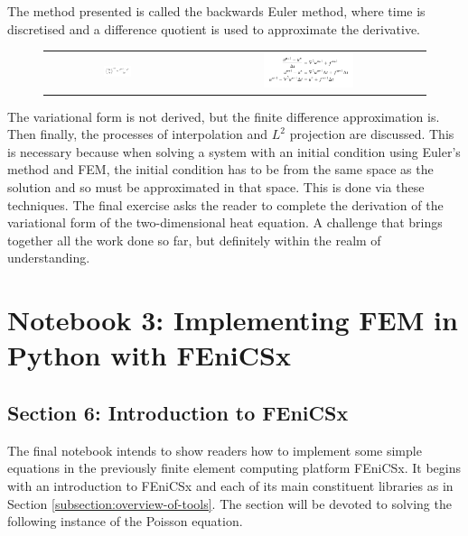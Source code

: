 The method presented is called the backwards Euler method, where time is discretised and a difference quotient is used to approximate the derivative.

\begin{figure}[H]
\centering
\begin{tabular}{cc}
\includegraphics[width=0.2\textwidth, frame]{./images/notebook2/6} &   \includegraphics[width=0.4\textwidth, frame]{./images/notebook2/7} 
\end{tabular}
\end{figure}

The variational form is not derived, but the finite difference approximation is. Then finally, the processes of interpolation and $L^2$ projection are discussed. This is necessary because when solving a system with an initial condition using Euler's method and FEM, the initial condition has to be from the same space as the solution and so must be approximated in that space. This is done via these techniques. The final exercise asks the reader to complete the derivation of the variational form of the two-dimensional heat equation. A challenge that brings together all the work done so far, but definitely within the realm of understanding.

\section{Notebook 3: Implementing FEM in Python with FEniCSx}

\subsection{Section 6: Introduction to FEniCSx}

The final notebook intends to show readers how to implement some simple equations in the previously finite element computing platform FEniCSx. It begins with an introduction to FEniCSx and each of its main constituent libraries as in Section \ref{subsection:overview-of-tools}. The section will be devoted to solving the following instance of the Poisson equation.

